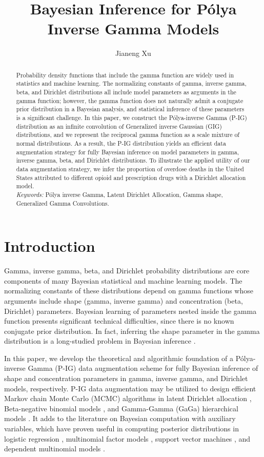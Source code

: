 \documentclass{statsoc}
\title[P\'olya Inverse Gamma]{Bayesian Inference for P\'olya Inverse Gamma Models}
\author[Jianeng Xu {\it et al.}]{Jianeng Xu}
\newcommand{\Polya}{P\'olya}
\begin{document}
\begin{abstract}
Probability density functions that include the gamma function are widely used in statistics and machine learning. The normalizing constants of gamma, inverse gamma, beta, and Dirichlet distributions all include model parameters as arguments in the gamma function; however, the gamma function does not naturally admit a conjugate prior distribution in a Bayesian analysis, and statistical inference of these parameters is a significant challenge.  In this paper, we construct the P\'olya-inverse Gamma (P-IG) distribution as an infinite convolution of Generalized inverse Gaussian (GIG) distributions, and we represent the reciprocal gamma function as a scale mixture of normal distributions.  As a result, the P-IG distribution yields an efficient data augmentation strategy for fully Bayesian inference on model parameters in gamma, inverse gamma, beta, and Dirichlet distributions.  To illustrate the applied utility of our data augmentation strategy, we infer the proportion of overdose deaths in the United States attributed to different opioid and prescription drugs with a Dirichlet allocation model.\\

\textit{Keywords:} P\'olya inverse Gamma, Latent Dirichlet Allocation,  Gamma shape, Generalized Gamma Convolutions.
\end{abstract}


\section{Introduction}
\label{sec:Introduction}
Gamma, inverse gamma, beta, and Dirichlet probability distributions are core components of many Bayesian statistical and machine learning models.  The normalizing constants of these distributions depend on gamma functions whose arguments include shape (gamma, inverse gamma) and concentration (beta, Dirichlet) parameters.  Bayesian learning of parameters nested inside the gamma function presents significant technical difficulties, since there is no known conjugate prior distribution.  In fact, inferring the shape parameter in the gamma distribution is a long-studied problem in Bayesian inference \citep{damsleth1975conjugate, rossell2009gaga, miller2018fast}.  

In this paper, we develop the theoretical and algorithmic foundation of a \Polya-inverse Gamma (P-IG) data augmentation scheme for fully Bayesian inference of shape and concentration parameters in gamma, inverse gamma, and Dirichlet models, respectively.  P-IG data augmentation may be utilized to design efficient Markov chain Monte Carlo (MCMC) algorithms in latent Dirichlet allocation \citep{blei2003latent}, Beta-negative binomial models \citep{zhou2012beta}, and Gamma-Gamma (GaGa) hierarchical models \citep{rossell2009gaga}.  It adds to the literature on Bayesian computation with auxiliary variables, which have proven useful in computing posterior distributions in logistic regression \citep{polson2013bayesian}, multinomial factor models \citep{holmes2006}, support vector machines \citep{mallick2005bayesian, polson2011data}, and dependent multinomial models \citep{linderman2015dependent}.   
\end{document}
